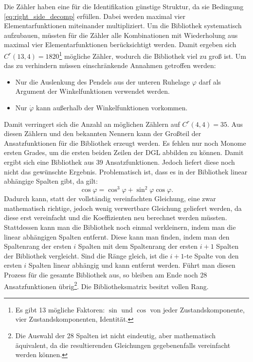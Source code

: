Die Zähler haben eine für die Identifikation günstige Struktur, da sie Bedingung \eqref{eq:right_side_decomp} erfüllen. Dabei werden maximal vier Elementarfunktionen miteinander multipliziert. Um die Bibliothek systematisch aufzubauen, müssten für die Zähler alle Kombinationen mit Wiederholung aus maximal vier Elementarfunktionen berücksichtigt werden. Damit ergeben sich $C^r(13,4) = 1820$\footnote{Es gibt 13 mögliche Faktoren: $\sin$ und $\cos$ von jeder Zustandskomponente, vier Zustandskomponenten, Identität.} mögliche Zähler, wodurch die Bibliothek viel zu groß ist. Um das zu verhindern müssen einschränkende Annahmen getroffen werden:
\begin{itemize}
\item Nur die Auslenkung des Pendels aus der unteren Ruhelage $\varphi$ darf als Argument der Winkelfunktionen verwendet werden. 
\item Nur $\dot{\varphi}$ kann außerhalb der Winkelfunktionen vorkommen.
\end{itemize}
Damit verringert sich die Anzahl an möglichen Zählern auf $C^r(4,4) = 35$. Aus diesen Zählern und den bekannten Nennern kann der Großteil der Ansatzfunktionen für die Bibliothek erzeugt werden. Es fehlen nur noch Monome ersten Grades, um die ersten beiden Zeilen der DGL abbilden zu können. Damit ergibt sich eine Bibliothek aus 39 Ansatzfunktionen. Jedoch liefert diese noch nicht das gewünschte Ergebnis. Problematisch ist, dass es in der Bibliothek linear abhängige Spalten gibt, da gilt: 
\begin{equation}
\cos \varphi = \cos ^3 \varphi+ \sin^2 \varphi\cos \varphi.
\end{equation}
Dadurch kann, statt der vollständig vereinfachten Gleichung, eine zwar mathematisch richtige, jedoch wenig verwertbare Gleichung geliefert werden, da diese erst vereinfacht und die Koeffizienten neu berechnet werden müssten. Stattdessen kann man die Bibliothek noch einmal verkleinern, indem man die linear abhängigen Spalten entfernt. Diese kann man finden, indem man den Spaltenrang der ersten $i$ Spalten mit dem Spaltenrang der ersten $i+1$ Spalten der Bibliothek vergleicht. Sind die Ränge gleich, ist die $i+1$-te Spalte von den ersten $i$ Spalten linear abhängig und kann entfernt werden. Führt man diesen Prozess für die gesamte Bibliothek aus, so bleiben am Ende noch 28 Ansatzfunktionen übrig\footnote{Die Auswahl der 28 Spalten ist nicht eindeutig, aber mathematisch äquivalent, da die resultierenden Gleichungen gegebenenfalls vereinfacht werden können.}. Die Bibliotheksmatrix besitzt vollen Rang.

